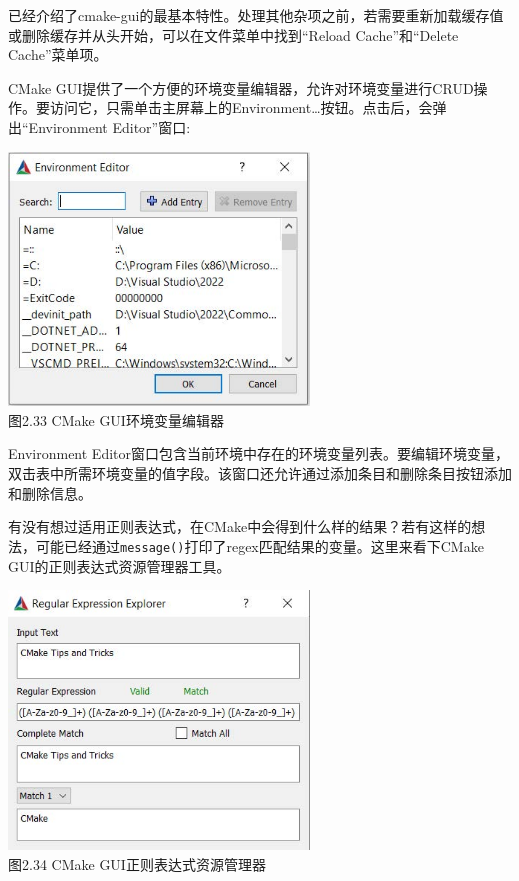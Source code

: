 已经介绍了cmake-gui的最基本特性。处理其他杂项之前，若需要重新加载缓存值或删除缓存并从头开始，可以在文件菜单中找到“Reload Cache”和“Delete Cache”菜单项。


CMake GUI提供了一个方便的环境变量编辑器，允许对环境变量进行CRUD操作。要访问它，只需单击主屏幕上的Environment…按钮。点击后，会弹出“Environment Editor”窗口:

\begin{center}
\includegraphics[width=0.6\textwidth]{content/1/chapter2/images/33.jpg}\\
图2.33  CMake GUI环境变量编辑器
\end{center}

Environment Editor窗口包含当前环境中存在的环境变量列表。要编辑环境变量，双击表中所需环境变量的值字段。该窗口还允许通过添加条目和删除条目按钮添加和删除信息。


有没有想过适用正则表达式，在CMake中会得到什么样的结果？若有这样的想法，可能已经通过\texttt{message()}打印了regex匹配结果的变量。这里来看下CMake GUI的正则表达式资源管理器工具。

\begin{center}
\includegraphics[width=0.6\textwidth]{content/1/chapter2/images/34.jpg}\\
图2.34  CMake GUI正则表达式资源管理器
\end{center}

